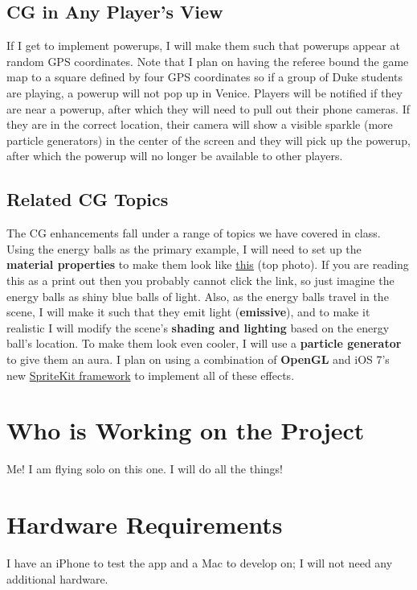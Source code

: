 \documentclass{article}
\begin{document}
\subsection{CG in Any Player's View}
If I get to implement powerups, I will make them such that
powerups appear at random GPS coordinates. Note that I plan on 
having the referee bound the game map to a square defined by four GPS 
coordinates so if a group of Duke students are playing, a powerup will
not pop up in Venice. Players will be notified if they are near a powerup, after
which they will need to pull out their phone cameras. If they are in the correct
location, their camera will show a visible sparkle (more particle generators) 
in the center of the screen
and they will pick up the powerup, after which the powerup will no longer be 
available to other players.
\subsection{Related CG Topics}
The CG enhancements fall under a range of topics we have covered in class. Using the
energy balls as the primary example,
I will need to set up the \textbf{material properties} to make them look like 
\href{http://blog.tricyclestudios.com/?tag=hadouken-photo}{this} (top photo).
If you are reading this as a print out then you probably cannot click the 
link, so just imagine the energy balls as shiny blue balls of light.
Also, as the energy balls travel in the scene, I will make it such that 
they emit light (\textbf{emissive}), and to make it realistic I will modify
the scene's \textbf{shading and lighting} based on the energy ball's location.
To make them look even cooler, I will use a \textbf{particle generator} to give
them an aura. I plan on using a combination of \textbf{OpenGL} and iOS 7's new 
\href{https://developer.apple.com/library/ios/documentation/GraphicsAnimation/Conceptual/SpriteKit_PG/Introduction/Introduction.html#//apple_ref/doc/uid/TP40013043}{SpriteKit framework} to implement all of these effects.

\section{Who is Working on the Project}
Me! I am flying solo on this one. I will do all the things! 

\section{Hardware Requirements}
I have an iPhone to test the app and a Mac to develop on; I will not need 
any additional hardware.
\end{document}
